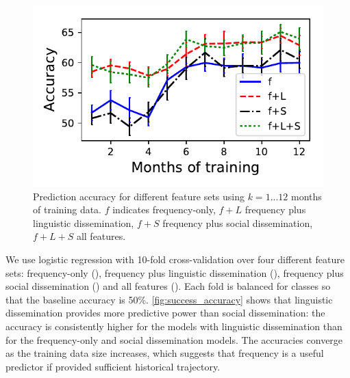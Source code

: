 \begin{figure}
\centering
\includegraphics[width=\columnwidth]{figures/success_1_12_window_lines.pdf}
\caption{Prediction accuracy for different feature sets using $k={1...12}$ months of training data. $f$ indicates frequency-only, $f+L$ frequency plus linguistic dissemination, $f+S$ frequency plus social dissemination, $f+L+S$ all features.}
\label{fig:success_accuracy}
\end{figure}

We use logistic regression with 10-fold cross-validation over four different feature sets: frequency-only (), frequency plus linguistic dissemination (), frequency plus social dissemination () and all features ().
Each fold is balanced for classes so that the baseline accuracy is 50\%.
\autoref{fig:success_accuracy} shows that linguistic dissemination provides more predictive power than social dissemination: the accuracy is consistently higher for the models with linguistic dissemination than for the frequency-only and social dissemination models.
The accuracies converge as the training data size increases, which suggests that frequency is a useful predictor if provided sufficient historical trajectory.



